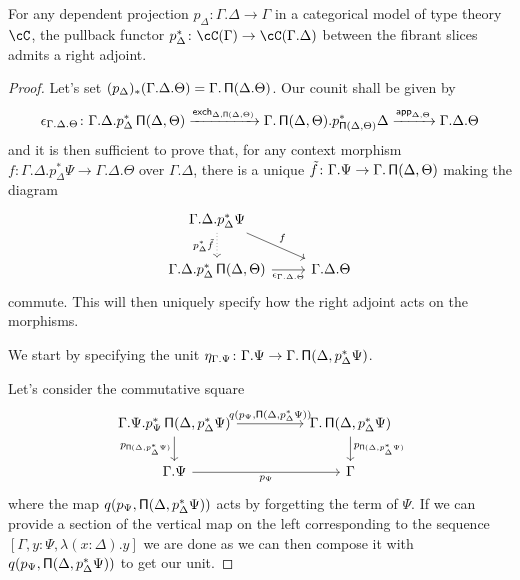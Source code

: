 \begin{lem}
  For any dependent projection $p_\Delta\colon\Gamma.\Delta\rightarrow\Gamma$ in
  a categorical model of type theory $\cC$, the pullback functor
  $p_\Delta^*\colon\cC(\Gamma)\rightarrow\cC(\Gamma.\Delta)$ between the fibrant
  slices admits a right adjoint.
\end{lem}
\begin{proof}

  Let's set $(p_\Delta)_*(\Gamma.\Delta.\Theta)=\Gamma.\operatorname{\mathsf{\Pi}}(\Delta.\Theta)$. Our
  counit shall be given by
  \[\epsilon_{\Gamma.\Delta.\Theta}\colon\Gamma.\Delta.p^*_\Delta\operatorname{\mathsf{\Pi}}(\Delta,\Theta)
  \xrightarrow{\operatorname{\mathsf{exch}}_{\Delta,\operatorname{\mathsf{\Pi}}(\Delta,\Theta)}}\Gamma.\operatorname{\mathsf{\Pi}}(\Delta,\Theta).p^*_{\operatorname{\mathsf{\Pi}}(\Delta,\Theta)}\Delta
  \xrightarrow{\operatorname{\mathsf{app}}_{\Delta,\Theta}}\Gamma.\Delta.\Theta\]
  and it is then sufficient to prove that, for any context morphism
  $f\colon\Gamma.\Delta.p^*_\Delta\Psi\rightarrow\Gamma.\Delta.\Theta$ over
  $\Gamma.\Delta$, there is
  a unique $\tilde{f}\colon\Gamma.\Psi\rightarrow\Gamma.\operatorname{\mathsf{\Pi}}(\Delta,\Theta)$
  making the diagram
  \[\begin{tikzcd}
    {\Gamma.\Delta.p^*_\Delta\Psi} \\
    {\Gamma.\Delta.p^*_\Delta\Pis(\Delta,\Theta)} & {\Gamma.\Delta.\Theta}
    \arrow["f", from=1-1, to=2-2]
    \arrow["{\epsilon_{\Gamma.\Delta.\Theta}}"', from=2-1, to=2-2]
    \arrow["{p^*_\Delta\tilde{f}}"', dotted, from=1-1, to=2-1]
  \end{tikzcd}\]
  commute. This will then uniquely specify how the right adjoint acts on the
  morphisms.

  We start by specifying the unit
  $\eta_{\Gamma.\Psi}\colon\Gamma.\Psi\rightarrow\Gamma.\operatorname{\mathsf{\Pi}}(\Delta,p^*_{\Delta}\Psi)$.

  Let's consider the commutative square
  \[\begin{tikzcd}[column sep=huge]
    {\Gamma.\Psi.p^*_\Psi\Pis(\Delta,p^*_\Delta\Psi)} & {\Gamma.\Pis(\Delta,p^*_\Delta\Psi)} \\
    {\Gamma.\Psi} & \Gamma
    \arrow["{p_{\Pis(\Delta,p^*_\Delta\Psi)}}"', from=1-1, to=2-1]
    \arrow["{p_{\Psi}}"', from=2-1, to=2-2]
    \arrow["{p_{\Pis(\Delta,p^*_\Delta\Psi)}}", from=1-2, to=2-2]
    \arrow["{q(p_\Psi,\Pis(\Delta,p^*_\Delta\Psi))}", from=1-1, to=1-2]
  \end{tikzcd}\]
  where the map $q(p_\Psi,\operatorname{\mathsf{\Pi}}(\Delta,p^*_\Delta\Psi))$ acts by forgetting the
  term of $\Psi$. If we can provide a section of the vertical map on the left
  corresponding to the sequence $[\Gamma,y:\Psi,\lambda(x:\Delta).y]$ we are
  done as we can then compose
  it with $q(p_\Psi,\operatorname{\mathsf{\Pi}}(\Delta,p^*_\Delta\Psi))$ to get our unit.
  

\end{proof}
